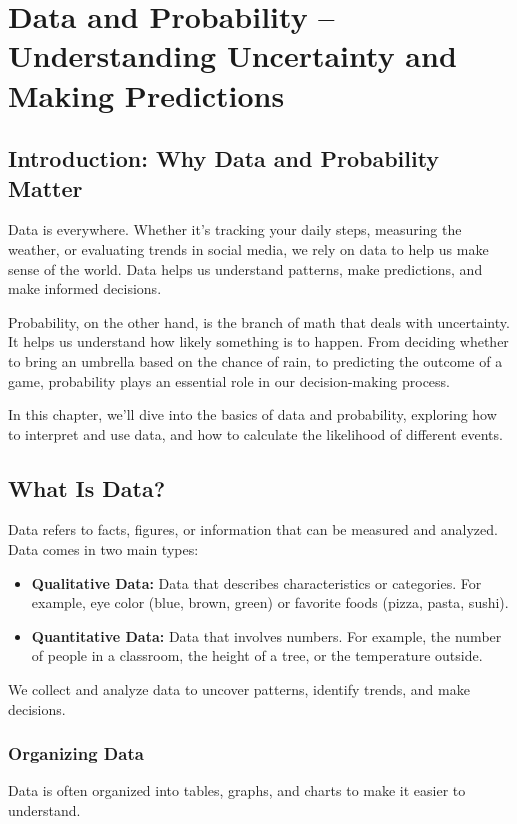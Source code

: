 \chapter{Data and Probability – Understanding Uncertainty and Making Predictions}

\section{Introduction: Why Data and Probability Matter}
Data is everywhere. Whether it's tracking your daily steps, measuring the weather, or evaluating trends in social media, we rely on data to help us make sense of the world. Data helps us understand patterns, make predictions, and make informed decisions.

Probability, on the other hand, is the branch of math that deals with uncertainty. It helps us understand how likely something is to happen. From deciding whether to bring an umbrella based on the chance of rain, to predicting the outcome of a game, probability plays an essential role in our decision-making process.

In this chapter, we'll dive into the basics of data and probability, exploring how to interpret and use data, and how to calculate the likelihood of different events.

\section{What Is Data?}
Data refers to facts, figures, or information that can be measured and analyzed. Data comes in two main types:

\begin{itemize}
    \item \textbf{Qualitative Data:} Data that describes characteristics or categories. For example, eye color (blue, brown, green) or favorite foods (pizza, pasta, sushi).
    \item \textbf{Quantitative Data:} Data that involves numbers. For example, the number of people in a classroom, the height of a tree, or the temperature outside.
\end{itemize}

We collect and analyze data to uncover patterns, identify trends, and make decisions.

\subsection{Organizing Data}
Data is often organized into tables, graphs, and charts to make it easier to understand.

